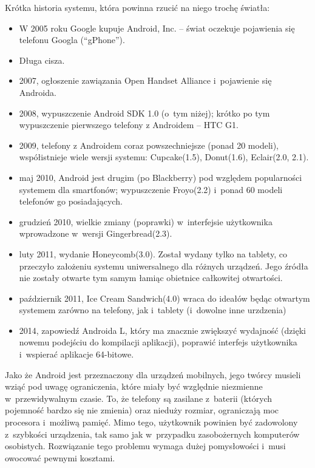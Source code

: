 Krótka historia systemu, która powinna rzucić na niego trochę światła:
\begin{itemize}
	\item W 2005 roku Google kupuje Android, Inc. -- świat oczekuje pojawienia się telefonu Googla (``gPhone'').
	\item Długa cisza.
	\item 2007, ogłoszenie zawiązania Open Handset Alliance i~pojawienie się Androida.
	\item 2008, wypuszczenie Android SDK 1.0 (o~tym niżej); krótko po tym wypuszczenie pierwszego telefony z Androidem -- HTC G1.
	\item 2009, telefony z Androidem coraz powszechniejsze (ponad 20 modeli), współistnieje wiele wersji systemu: Cupcake(1.5), Donut(1.6), Eclair(2.0, 2.1).
	\item maj 2010, Android jest drugim (po Blackberry) pod względem popularności systemem dla smartfonów; wypuszczenie Froyo(2.2) i~ponad 60 modeli telefonów go posiadających.
	\item grudzień 2010, wielkie zmiany (poprawki) w~interfejsie użytkownika wprowadzone w~wersji Gingerbread(2.3).
	\item luty 2011, wydanie Honeycomb(3.0)\cite{androidhistory}. Został wydany tylko na tablety, co przeczyło założeniu systemu uniwersalnego dla różnych urządzeń. Jego źródła nie zostały otwarte tym samym łamiąc obietnice całkowitej otwartości.
	\item październik 2011, Ice Cream Sandwich(4.0) wraca do ideałów będąc otwartym systemem zarówno na telefony, jak i~tablety (i~dowolne inne urzdzenia)
	\item 2014, zapowiedź Androida L, który ma znacznie zwiększyć wydajność (dzięki nowemu podejściu do kompilacji aplikacji\cite{androidart}), poprawić interfejs użytkownika i~wspierać aplikacje 64-bitowe\cite{androidlogolnie}.
\end{itemize}

Jako że Android jest przeznaczony dla urządzeń mobilnych, jego twórcy musieli wziąć pod uwagę ograniczenia, które miały być względnie niezmienne w~przewidywalnym czasie.
To, że telefony są zasilane z~baterii (których pojemność bardzo się nie zmienia) oraz nieduży rozmiar, ograniczają moc procesora i~możliwą pamięć. Mimo tego, użytkownik powinien być zadowolony z~szybkości urządzenia, tak samo jak w~przypadku zasobożernych komputerów osobistych.
Rozwiązanie tego problemu wymaga dużej pomysłowości i~musi owocować pewnymi kosztami.

